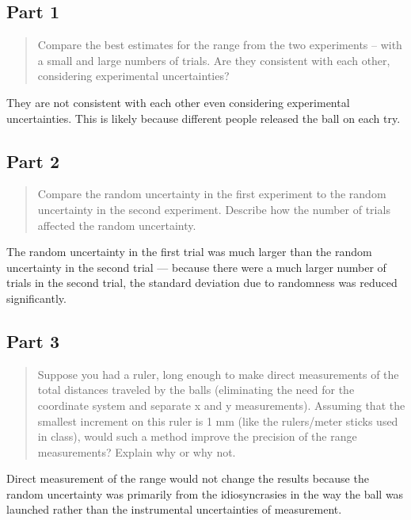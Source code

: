 \documentclass[8pt]{extarticle}
\begin{document}
{\subsection*{Part 1}
\begin{quote}
	Compare the best estimates for the range from the two experiments – with a small and large numbers of trials.  Are they consistent with each other, considering experimental uncertainties?
\end{quote}
They are not consistent with each other even considering experimental uncertainties. This is likely because different people released the ball on each try.
\subsection*{Part 2}
\begin{quote}
	Compare the random uncertainty in the first experiment to the random uncertainty in the second experiment.  Describe how the number of trials affected the random uncertainty.
\end{quote}
The random uncertainty in the first trial was much larger than the random uncertainty in the second trial — because there were a much larger number of trials in the second trial, the standard deviation due to randomness was reduced significantly.
\subsection*{Part 3}
\begin{quote}
	Suppose you had a ruler, long enough to make direct measurements of the total distances traveled by the balls (eliminating the need for the coordinate system and separate x and y measurements).  Assuming that the smallest increment on this ruler is 1 mm (like the rulers/meter sticks used in class), would such a method improve the precision of the range measurements? Explain why or why not.
\end{quote}
Direct measurement of the range would not change the results because the random uncertainty was primarily from the idiosyncrasies in the way the ball was launched rather than the instrumental uncertainties of measurement.
}
\end{document}
